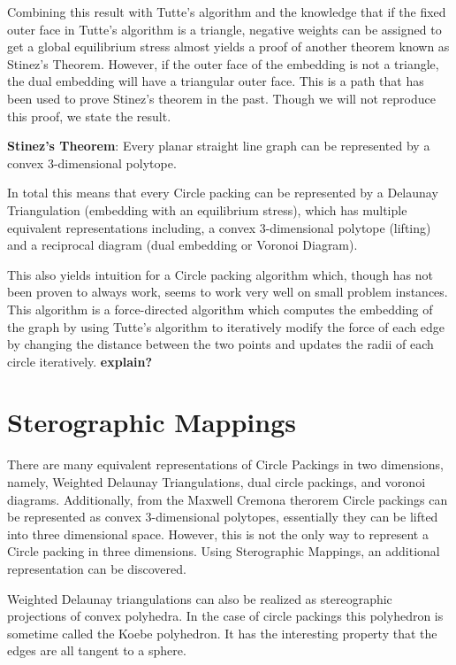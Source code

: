 \documentclass[11pt]{article}
\begin{document}
 Combining this result with Tutte's algorithm and the knowledge that if the fixed outer face in Tutte's algorithm is a triangle, negative weights can be assigned to get a global equilibrium stress almost yields a proof of another theorem known as Stinez's Theorem. However, if the outer face of the embedding is not a triangle, the dual embedding will have a triangular outer face. This is a path that has been used to prove Stinez's theorem in the past. Though we will not reproduce this proof, we state the result.
 
 \textbf{Stinez's Theorem}: Every planar straight line graph can be represented by a convex 3-dimensional polytope.
 
 In total this means that every Circle packing can be represented by a Delaunay Triangulation (embedding with an equilibrium stress), which has multiple equivalent representations including, a convex 3-dimensional polytope (lifting) and a reciprocal diagram (dual embedding or Voronoi Diagram). 

This also yields intuition for a Circle packing algorithm which, though has not been proven to always work, seems to work very well on small problem instances. This algorithm is a force-directed algorithm which computes the embedding of the graph by using Tutte's algorithm to iteratively modify the force of each edge by changing the distance between the two points and updates the radii of each circle iteratively. \textbf{explain?}
 
\section{Sterographic Mappings}
There are many equivalent representations of Circle Packings in two dimensions, namely, Weighted Delaunay Triangulations, dual circle packings, and voronoi diagrams. Additionally, from the Maxwell Cremona therorem Circle packings can be represented as convex 3-dimensional polytopes, essentially they can be lifted into three dimensional space. However, this is not the only way to represent a Circle packing in three dimensions. Using Sterographic Mappings, an additional representation can be discovered. 


Weighted Delaunay triangulations can also be realized as stereographic projections of convex polyhedra. In the case of circle packings this polyhedron is sometime called the Koebe polyhedron. It has the interesting property that the edges are all tangent to a sphere.
\end{document}
